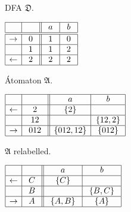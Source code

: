 \documentclass{llncs}
\newcommand{\fA}{{\mathfrak A}}
\newcommand{\fD}{{\mathfrak D}}
\begin{document}
\begin{example}
\begin{table}[hbt]
\begin{minipage}[b]{0.3\linewidth}
\caption{DFA $\fD$.}
\label{tab:d}
\begin{center}
$
\begin{array}{|c|c|| c|c|}    
\hline
 & & \  a \
& \ b \  \\
\hline
\hline
\rightarrow & 0 & 1
& 0  \\
\hline  
 & 1 & 
1 &    2  \\
\hline  
\leftarrow & \ 2 \ & \ 2 \
& \ 2 \ \\
\hline  
\end{array}
$
\end{center}
\end{minipage}
\hspace{0.1cm}
\begin{minipage}[b]{0.3\linewidth}
\caption{\'Atomaton $\fA$.}
\label{tab:a}
\begin{center}
$
\begin{array}{|c| c||c| c| }    
\hline
& \ \  \ \ 
&\ \ a \ \ &\ \ b \ \   \\
\hline  
\leftarrow & 2
& \{2 \} &  \\
\hline  
 & 12
&   & \{12,2\}  \\
\hline  
\rightarrow & \ 012 \
&  \{012,12\}  & \ \{012\} \  \\
\hline  
\end{array}
$
\end{center}
\end{minipage}
\hspace{0.3cm}
\begin{minipage}[b]{0.3\linewidth}
\caption{$\fA$ relabelled.}
\label{tab:a_relabel}
\begin{center}
$
\begin{array}{|c| c||c| c| }    
\hline
& \ \  \ \ 
&\ \ a \ \ &\ \ b \ \   \\
\hline  
\leftarrow & C
& \{C\} &  \\
\hline  
 & B
&   &  \ \{B,C\} \ \\
\hline  
\rightarrow & \ A \
& \ \{A,B\} \ & \ \{A\} \  \\
\hline  
\end{array}
$
\end{center}
\end{minipage}
\end{table}


\end{example}
\end{document}
